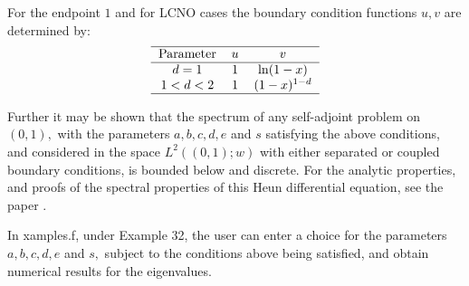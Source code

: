 \documentclass[12pt]{amsart}%
\theoremstyle{plain}
\numberwithin{equation}{section}
\begin{document}
\begin{enumerate}
For the endpoint $1$ and for LCNO cases the boundary condition functions $u,v$
are determined by:%
\[%
\begin{tabular}
[c]{ccc}\hline
Parameter & $u$ & $v$\\\hline
$d=1$ & $1$ & $\ln(1-x)$\\
$1<d<2$ & $1$ & $(1-x)^{1-d}$\\\hline
\end{tabular}
\]

Further it may be shown that the spectrum of any self-adjoint problem on
$(0,1),$ with the parameters $a,b,c,d,e$ and $s$ satisfying the above
conditions, and considered in the space $L^{2}((0,1);w)$ with either separated
or coupled boundary conditions, is bounded below and discrete. For the
analytic properties, and proofs of the spectral properties of this Heun
differential equation, see the paper \cite{BEHZ}.

In xamples.f, under Example 32, the user can enter a choice for the parameters
$a,b,c,d,e$ and $s,$ subject to the conditions above being satisfied, and
obtain numerical results for the eigenvalues.
\end{enumerate}
\end{document}
